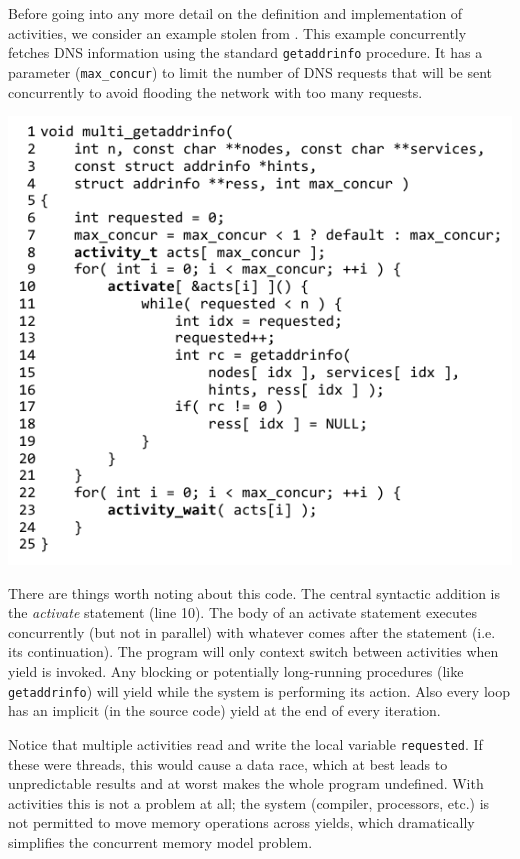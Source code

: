 \documentclass[10pt,preprint]{sigplanconf}
\begin{document}
Before going into any more detail on the definition and implementation of activities, we consider an example stolen from \cite{Krohn2007}.
This example concurrently fetches DNS information using the standard \texttt{getaddrinfo} procedure.
It has a parameter (\texttt{max\_concur}) to limit the number of DNS requests that will be sent concurrently to avoid flooding the network with too many requests.

\hspace{-0.5cm}
\includegraphics{multi_getaddrinfo}

There are things worth noting about this code.
The central syntactic addition is the \emph{activate} statement (line 10).
The body of an activate statement executes concurrently (but not in parallel) with whatever comes after the statement (i.e. its continuation).
The program will only context switch between activities when yield is invoked.
Any blocking or potentially long-running procedures (like \texttt{getaddrinfo}) will yield while the system is performing its action.
Also every loop has an implicit (in the source code) yield at the end of every iteration.

Notice that multiple activities read and write the local variable \texttt{requested}.
If these were threads, this would cause a data race, which at best leads to unpredictable results and at worst makes the whole program undefined.
With activities this is not a problem at all; the system (compiler, processors, etc.) is not permitted to move memory operations across yields, which dramatically simplifies the concurrent memory model problem.
\end{document}
